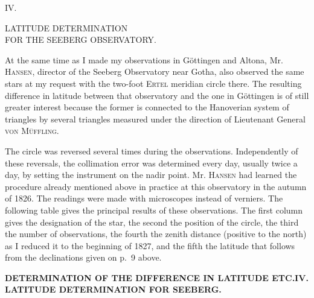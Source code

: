 \begingroup
\setlength{\abovedisplayskip}{7pt}
\setlength{\belowdisplayskip}{7pt}
\setlength{\abovedisplayshortskip}{3pt}
\setlength{\belowdisplayshortskip}{4pt}

\par\clearpage

\vspace*{.19\textheight}
\begin{center}
{\large IV.}\par\medskip
{\Large LATITUDE DETERMINATION\\FOR THE SEEBERG OBSERVATORY.}
\end{center}

At the same time as I made my observations in Göttingen and Altona,
Mr. \textsc{Hansen}, director of the Seeberg Observatory near Gotha, also
observed the same stars at my request with the two-foot \textsc{Ertel} meridian
circle there.
The resulting difference in latitude between that observatory and the one
in Göttingen is of still greater interest because the former is connected to the
Hanoverian system of triangles by several triangles measured under the direction
of Lieutenant General \textsc{von Müffling}.

The circle was reversed several times during the observations.
Independently of these reversals, the collimation error was determined every day,
usually twice a day, by setting the instrument on the nadir point. Mr. \textsc{Hansen}
had learned the procedure already mentioned above in practice at this observatory
in the autumn of 1826. The readings were made with microscopes instead of verniers.
The following table gives the principal results of these observations. The first
column gives the designation of the star, the second the position of the circle,
the third the number of observations, the fourth the zenith distance (positive
to the north) as I reduced it to the beginning of 1827, and the fifth the latitude
that follows from the declinations given on p.~9 above.

\par\clearpage
\noindent\makebox[12mm][l]{}\parbox[t]{\dimexpr\linewidth-24mm\relax}{\centering\scriptsize\bfseries DETERMINATION OF THE DIFFERENCE IN LATITUDE ETC.\quad IV. LATITUDE DETERMINATION FOR SEEBERG.}\par\medskip

